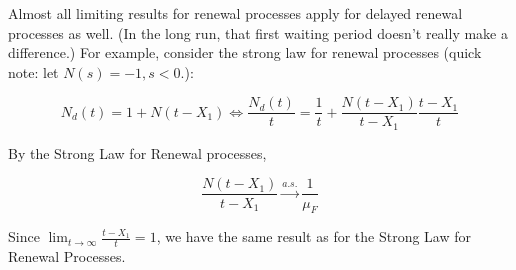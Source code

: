 \begin{remark} Almost all limiting results for renewal processes apply for delayed renewal processes as well. (In the long run, that first waiting period doesn't really make a difference.) For example, consider the strong law for renewal processes (quick note: let \(N(s)=-1, s < 0.\)):

\[
N_d(t) = 1 + N(t - X_1)  \iff \frac{N_d(t)}{t} = \frac{1}{t} + \frac{N(t - X_1)}{t-X_1} \frac{t- X_1}{t}
\]

By the Strong Law for Renewal processes,

\[
\frac{N(t - X_1)}{t-X_1} \xrightarrow{a.s.} \frac{1}{\mu_F}
\]

Since \(\lim_{t \to \infty} \frac{t- X_1}{t} = 1\), we have the same result as for the Strong Law for Renewal Processes.

\end{remark}

